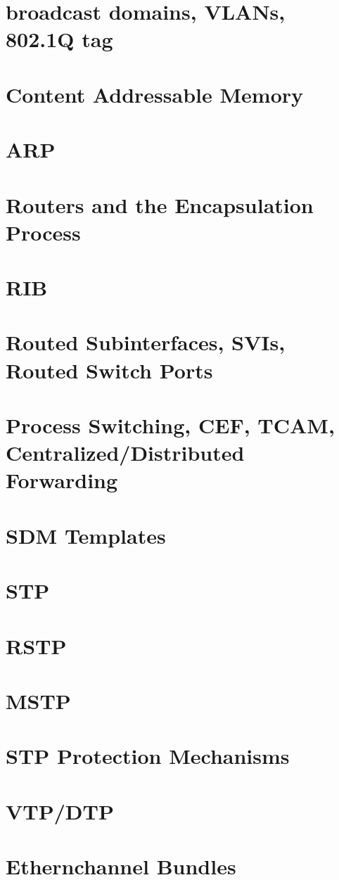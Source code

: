 \documentclass[parindent=0pt]{article}
\begin{document}
\section*{broadcast domains, VLANs, 802.1Q tag}	


\section*{Content Addressable Memory}


\section*{ARP}


\section*{Routers and the Encapsulation Process}


\section*{RIB}


\section*{Routed Subinterfaces, SVIs, Routed Switch Ports}


\section*{Process Switching, CEF, TCAM, Centralized/Distributed Forwarding}


\section*{SDM Templates}


\section*{STP}


\section*{RSTP}


\section*{MSTP}


\section*{STP Protection Mechanisms}


\section*{VTP/DTP}


\section*{Ethernchannel Bundles}
\end{document}
